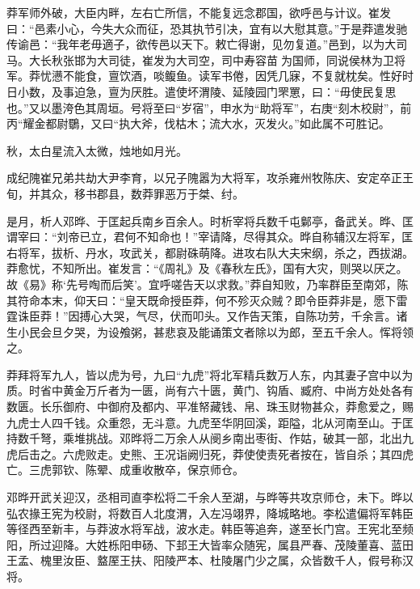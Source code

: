 \documentclass[12pt,UTF8]{ctexbook}
\begin{document}
莽军师外破，大臣内畔，左右亡所信，不能复远念郡国，欲呼邑与计议。崔发曰：“邑素小心，今失大众而征，恐其执节引决，宜有以大慰其意。”于是莽遣发驰传谕邑：“我年老毋適子，欲传邑以天下。敕亡得谢，见勿复道。”邑到，以为大司马。大长秋张邯为大司徒，崔发为大司空，司中寿容苗为国师，同说侯林为卫将军。莽忧懑不能食，亶饮酒，啖鳆鱼。读军书倦，因凭几寐，不复就枕矣。性好时日小数，及事迫急，亶为厌胜。遣使坏渭陵、延陵园门罘罳，曰：“毋使民复思也。”又以墨洿色其周垣。号将至曰“岁宿”，申水为“助将军”，右庚“刻木校尉”，前丙“耀金都尉鸀，又曰“执大斧，伐枯木；流大水，灭发火。”如此属不可胜记。



秋，太白星流入太微，烛地如月光。



成纪隗崔兄弟共劫大尹李育，以兄子隗嚣为大将军，攻杀雍州牧陈庆、安定卒正王旬，并其众，移书郡县，数莽罪恶万于桀、纣。



是月，析人邓晔、于匡起兵南乡百余人。时析宰将兵数千屯鄡亭，备武关。晔、匡谓宰曰：“刘帝已立，君何不知命也！”宰请降，尽得其众。晔自称辅汉左将军，匡右将军，拔析、丹水，攻武关，都尉硃萌降。进攻右队大夫宋纲，杀之，西拔湖。莽愈忧，不知所出。崔发言：“《周礼》及《春秋左氏》，国有大灾，则哭以厌之。故《易》称‘先号啕而后笑’。宜呼嗟告天以求救。”莽自知败，乃率群臣至南郊，陈其符命本末，仰天曰：“皇天既命授臣莽，何不殄灭众贼？即令臣莽非是，愿下雷霆诛臣莽！”因搏心大哭，气尽，伏而叩头。又作告天策，自陈功劳，千余言。诸生小民会旦夕哭，为设飧粥，甚悲哀及能诵策文者除以为郎，至五千余人。恽将领之。



莽拜将军九人，皆以虎为号，九曰“九虎”将北军精兵数万人东，内其妻子宫中以为质。时省中黄金万斤者为一匮，尚有六十匮，黄门、钩盾、臧府、中尚方处处各有数匮。长乐御府、中御府及都内、平准帑藏钱、帛、珠玉财物甚众，莽愈爱之，赐九虎士人四千钱。众重怨，无斗意。九虎至华阴回溪，距隘，北从河南至山。于匡持数千弩，乘堆挑战。邓晔将二万余人从阌乡南出枣街、作姑，破其一部，北出九虎后击之。六虎败走。史熊、王况诣阙归死，莽使使责死者按在，皆自杀；其四虎亡。三虎郭钦、陈翚、成重收散卒，保京师仓。



邓晔开武关迎汉，丞相司直李松将二千余人至湖，与晔等共攻京师仓，未下。晔以弘农掾王宪为校尉，将数百人北度渭，入左冯翊界，降城略地。李松遣偏将军韩臣等径西至新丰，与莽波水将军战，波水走。韩臣等追奔，遂至长门宫。王宪北至频阳，所过迎降。大姓栎阳申砀、下邽王大皆率众随宪，属县严春、茂陵董喜、蓝田王孟、槐里汝臣、盩厔王扶、阳陵严本、杜陵屠门少之属，众皆数千人，假号称汉将。
\end{document}
